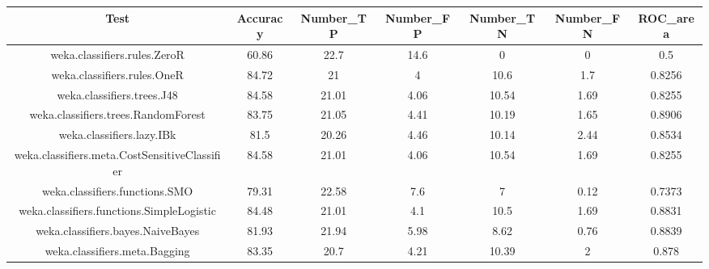 \documentclass[
]{article}
\begin{document}
\begin{longtable}[]{@{}ccccccc@{}}
\toprule()
Test & Accuracy & Number\_TP & Number\_FP & Number\_TN & Number\_FN &
ROC\_area \\
\midrule()
\endhead
weka.classifiers.rules.ZeroR & 60.86 & 22.7 & 14.6 & 0 & 0 & 0.5 \\
weka.classifiers.rules.OneR & 84.72 & 21 & 4 & 10.6 & 1.7 & 0.8256 \\
weka.classifiers.trees.J48 & 84.58 & 21.01 & 4.06 & 10.54 & 1.69 &
0.8255 \\
weka.classifiers.trees.RandomForest & 83.75 & 21.05 & 4.41 & 10.19 &
1.65 & 0.8906 \\
weka.classifiers.lazy.IBk & 81.5 & 20.26 & 4.46 & 10.14 & 2.44 &
0.8534 \\
weka.classifiers.meta.CostSensitiveClassifier & 84.58 & 21.01 & 4.06 &
10.54 & 1.69 & 0.8255 \\
weka.classifiers.functions.SMO & 79.31 & 22.58 & 7.6 & 7 & 0.12 &
0.7373 \\
weka.classifiers.functions.SimpleLogistic & 84.48 & 21.01 & 4.1 & 10.5 &
1.69 & 0.8831 \\
weka.classifiers.bayes.NaiveBayes & 81.93 & 21.94 & 5.98 & 8.62 & 0.76 &
0.8839 \\
weka.classifiers.meta.Bagging & 83.35 & 20.7 & 4.21 & 10.39 & 2 &
0.878 \\
\bottomrule()
\end{longtable}
\end{document}
